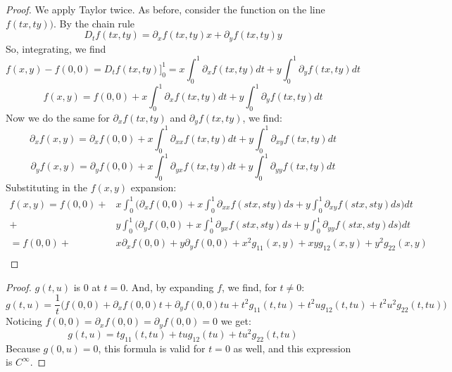 \begin{problem}
\end{problem}

\begin{proof}
	We apply Taylor twice. As before, consider the function on the line $f(tx,ty))$. By the chain rule
	$$D_t f(tx,ty) = \partial_x f(tx,ty)x + \partial_y f(tx,ty)y$$
	So, integrating, we find
	$$f(x,y) - f(0,0) = D_t f(tx,ty) \bigg ]_{0}^{1} = x \int_{0}^{1} \partial_x f(tx,ty) dt + y \int_{0}^{1} \partial_y f(tx,ty) dt$$
	$$f(x,y)  = f(0,0) +  x \int_{0}^{1} \partial_x f(tx,ty) dt + y \int_{0}^{1} \partial_y f(tx,ty) dt$$
	Now we do the same for $\partial_x f(tx,ty)$ and $\partial_y f(tx,ty)$, we find:
	$$\partial_x f(x,y)  = \partial_x f(0,0) +  x \int_{0}^{1} \partial_{xx} f(tx,ty) dt + y \int_{0}^{1} \partial_{xy} f(tx,ty) dt$$
	$$\partial_y f(x,y)  = \partial_{y} f(0,0) +  x \int_{0}^{1} \partial_{yx} f(tx,ty) dt + y \int_{0}^{1} \partial_{yy} f(tx,ty) dt$$
	Substituting in the $f(x,y)$ expansion:
	\begin{align*}
		f(x,y)  = f(0,0) + & x \int_{0}^{1}\Bigg( \partial_x f(0,0) +  x \int_{0}^{1} \partial_{xx} f(stx,sty) ds + y \int_{0}^{1} \partial_{xy} f(stx,sty) ds \Bigg) dt \\
		+                  & y \int_{0}^{1}\Bigg( \partial_y f(0,0) +  x \int_{0}^{1} \partial_{yx} f(stx,sty) ds + y \int_{0}^{1} \partial_{yy} f(stx,sty) ds \Bigg) dt \\
		= f(0,0) +         & x \partial_x f(0,0) + y \partial_y f(0,0) + x^2 g_{11}(x,y) + xy g_{12}(x,y) + y^2 g_{22}(x,y)                                              \\
	\end{align*}
\end{proof}

\begin{problem}
\end{problem}

\begin{proof}
	$g(t,u)$ is 0 at $t = 0$. And, by expanding $f$, we find, for $t \neq 0$:
	\begin{equation*}
		g(t,u) = \frac{1}{t} \bigg( f(0,0)  + \partial_x f(0,0) t + \partial_y f(0,0) tu  +
		t^2 g_{11}(t,tu) + t^2u g_{12}(t,tu) + t^2u^2 g_{22}(t,tu) \bigg)
	\end{equation*}
	Noticing $f(0,0) = \partial_x f(0,0) = \partial_y f(0,0) = 0$ we get:
	$$g(t,u) = t g_{11}(t,tu) + tu g_{12}(tu) + tu^2 g_{22}(t,tu)$$
	Because $g(0,u) = 0$, this formula is valid for $t = 0$ as well, and this expression is $C^\infty$.
\end{proof}

